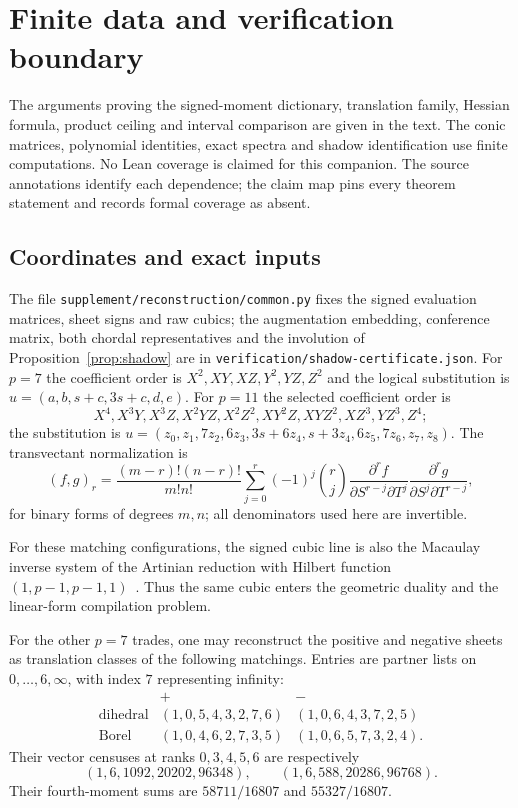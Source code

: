 \section{Finite data and verification boundary}\label{sec:finite-data}
The arguments proving the signed-moment dictionary, translation family,
Hessian formula, product ceiling and interval comparison are given in the
text. The conic matrices, polynomial identities, exact spectra and shadow
identification use finite computations. No Lean coverage is claimed for this
companion. The source annotations identify each dependence; the claim map
pins every theorem statement and records formal coverage as absent.

\subsection{Coordinates and exact inputs}
The file \texttt{supplement/reconstruction/common.py} fixes the signed
evaluation matrices, sheet signs and raw cubics; the augmentation embedding,
conference matrix, both chordal representatives and the involution of
Proposition~\ref{prop:shadow} are in
\texttt{verification/shadow-certificate.json}. For $p=7$ the coefficient order is
$X^2,XY,XZ,Y^2,YZ,Z^2$ and the logical substitution is
$u=(a,b,s+c,3s+c,d,e)$.
For $p=11$ the selected coefficient order is
\[
 X^4,X^3Y,X^3Z,X^2YZ,X^2Z^2,XY^2Z,XYZ^2,XZ^3,YZ^3,Z^4;
\]
the substitution is
$u=(z_0,z_1,7z_2,6z_3,3s+6z_4,s+3z_4,6z_5,7z_6,z_7,z_8)$.
The transvectant normalization is
\[
 (f,g)_r=\frac{(m-r)!(n-r)!}{m!n!}
 \sum_{j=0}^r(-1)^j\binom rj
 \frac{\partial^rf}{\partial S^{r-j}\partial T^j}
 \frac{\partial^rg}{\partial S^j\partial T^{r-j}},
\]
for binary forms of degrees $m,n$; all denominators used here are invertible.

For these matching configurations, the signed cubic line is also the Macaulay
inverse system of the Artinian reduction with Hilbert function
$(1,p-1,p-1,1)$~\cite[Corollary on self-association and cubic duality]{tradegeometry}.
Thus the same cubic enters the geometric duality and the linear-form
compilation problem.

For the other $p=7$ trades, one may reconstruct the positive and negative
sheets as translation classes of the following matchings. Entries are partner
lists on $0,\ldots,6,\infty$, with index $7$ representing infinity:
\[
\begin{array}{c|cc}
 &+&-\\\hline
\text{dihedral}&(1,0,5,4,3,2,7,6)&(1,0,6,4,3,7,2,5)\\
\text{Borel}&(1,0,4,6,2,7,3,5)&(1,0,6,5,7,3,2,4).
\end{array}
\]
Their vector censuses at ranks $0,3,4,5,6$ are respectively
\[
 (1,6,1092,20202,96348),\qquad (1,6,588,20286,96768).
\]
Their fourth-moment sums are $58711/16807$ and $55327/16807$.


